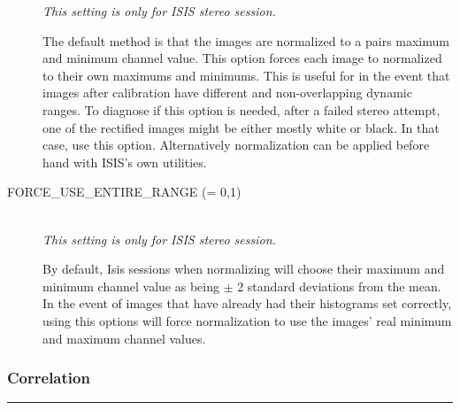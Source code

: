 \begin{description}
  \emph{This setting is only for ISIS stereo session.}

  The default method is that the images are normalized to a pairs
  maximum and minimum channel value. This option forces each image to
  normalized to their own maximums and minimums. This is useful for in
  the event that images after calibration have different and
  non-overlapping dynamic ranges. To diagnose if this option is
  needed, after a failed stereo attempt, one of the rectified images
  might be either mostly white or black. In that case, use this
  option. Alternatively normalization can be applied before hand with
  ISIS's own utilities.

\item[FORCE\_USE\_ENTIRE\_RANGE \textnormal{\small{(= 0,1)}}] \hfill \\

  \emph{This setting is only for ISIS stereo session.}

  By default, Isis sessions when normalizing will choose their maximum and
  minimum channel value as being $\pm$ 2 standard deviations from the
  mean. In the event of images that have already had their histograms
  set correctly, using this options will force normalization to use
  the images' real minimum and maximum channel values.

\end{description}

\subsubsection*{Correlation}
\hrule
\bigskip

